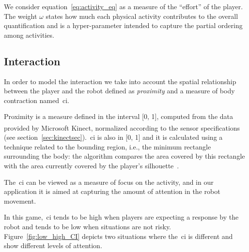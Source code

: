 We consider equation~\ref{eq:activity_eq} as a measure of the ``effort'' of the player. The weight $\omega$ states how much each physical activity contributes to the overall quantification and is a hyper-parameter intended to capture the partial ordering among activities.

\subsection{Interaction}\label{Interaction}
In order to model the interaction we take into account the spatial relationship between the player and the robot defined as \textit{proximity} and a measure of body contraction named~\gls{ci}.

Proximity is a measure defined in the interval [0, 1], computed from the data provided by Microsoft Kinect\textsuperscript{\textregistered}, normalized according to the sensor specifications (see section~\ref{sec:kinectsec}).~\gls{ci} is also in [0, 1] and it is calculated using a technique related to the bounding region, i.e., the minimum rectangle surrounding the body: the algorithm compares the area covered by this rectangle with the area currently covered by the player's silhouette~\citep{castellano_recognising_2007}.

The~\glsdesc{ci} can be viewed as a measure of focus on the activity, and in our application it is aimed at capturing the amount of attention in the robot movement. 

In this game,~\gls{ci} tends to be high when players are expecting a response by the robot and tends to be low when situations are not risky. Figure~\ref{fig:low_high_CI} depicts two situations where the~\gls{ci} is different and show different levels of attention.

